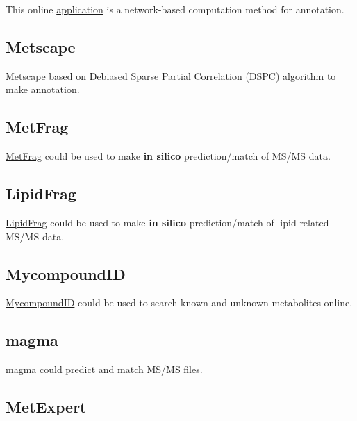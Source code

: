 \documentclass[
]{book}
\begin{document}
This online \href{http://imet.seeslab.net/}{application} is a network-based computation method for annotation\citep{aguilar-mogas2017}.

\hypertarget{metscape}{%
\subsection{Metscape}\label{metscape}}

\href{http://metscape.med.umich.edu/}{Metscape} based on Debiased Sparse Partial Correlation (DSPC) algorithm\citep{basu2017} to make annotation.

\hypertarget{metfrag}{%
\subsection{MetFrag}\label{metfrag}}

\href{http://c-ruttkies.github.io/MetFrag/}{MetFrag} could be used to make \textbf{in silico} prediction/match of MS/MS data\citep{ruttkies2016}.

\hypertarget{lipidfrag}{%
\subsection{LipidFrag}\label{lipidfrag}}

\href{https://msbi.ipb-halle.de/msbi/lipidfrag}{LipidFrag} could be used to make \textbf{in silico} prediction/match of lipid related MS/MS data\citep{witting2017}.

\hypertarget{mycompoundid}{%
\subsection{MycompoundID}\label{mycompoundid}}

\href{http://www.mycompoundid.org/mycompoundid_IsoMS/single.jsp}{MycompoundID} could be used to search known and unknown metabolites\citep{li2013a} online.

\hypertarget{magma}{%
\subsection{magma}\label{magma}}

\href{http://www.emetabolomics.org/magma}{magma} could predict and match MS/MS files.

\hypertarget{metexpert}{%
\subsection{MetExpert}\label{metexpert}}
\end{document}
